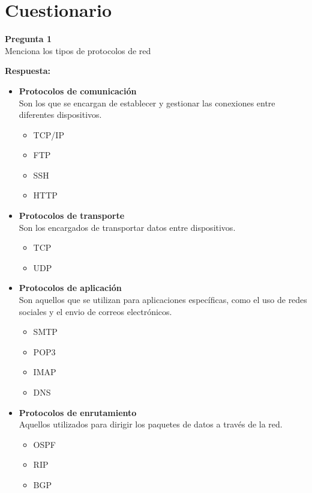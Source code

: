 \documentclass{article}
\newenvironment{problem}[2][Pregunta]
    { \begin{mdframed}[backgroundcolor=gray!20] \textbf{#1 #2} \\}
    {  \end{mdframed}}
\newenvironment{solution}
    {\textbf{Respuesta:\\}}
    {}
\begin{document}
\tableofcontents

\section{Cuestionario}

\begin{problem}
    {1} Menciona los tipos de protocolos de red
\end{problem}

\begin{solution}
    \begin{itemize}
        \item \textbf{Protocolos de comunicación} \\
        Son los que se encargan de establecer y gestionar las conexiones entre diferentes dispositivos.
        \begin{itemize}
            \item TCP/IP
            \item FTP
            \item SSH
            \item HTTP
        \end{itemize}

        \item \textbf{Protocolos de transporte}\\
        Son los encargados de transportar datos entre dispositivos.
        \begin{itemize}
            \item TCP
            \item UDP
        \end{itemize}

        \item \textbf{Protocolos de aplicación}\\
        Son aquellos que se utilizan para aplicaciones específicas, como el uso de redes sociales y el envio de correos electrónicos.
        \begin{itemize}
            \item SMTP
            \item POP3
            \item IMAP
            \item DNS
        \end{itemize}

        \item \textbf{Protocolos de enrutamiento}\\
        Aquellos utilizados para dirigir los paquetes de datos a través de la red.
        \begin{itemize}
            \item OSPF
            \item RIP
            \item BGP
        \end{itemize}


\end{itemize}
\end{solution}
\end{document}

